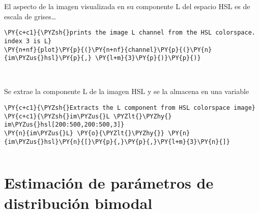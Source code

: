     El aspecto de la imagen visualizada en su componente L del espacio HSL
es de escala de grises\ldots{}

    \begin{tcolorbox}[breakable, size=fbox, boxrule=1pt, pad at break*=1mm,colback=cellbackground, colframe=cellborder]
\begin{Verbatim}[commandchars=\\\{\}]
\PY{c+c1}{\PYZsh{}prints the image L channel from the HSL colorspace. index 3 is L}
\PY{n+nf}{plot}\PY{p}{(}\PY{n+nf}{channel}\PY{p}{(}\PY{n}{im\PYZus{}hsl}\PY{p}{,} \PY{l+m}{3}\PY{p}{)}\PY{p}{)}
\end{Verbatim}
\end{tcolorbox}

    \begin{center}
    \end{center}
    { \hspace*{\fill} \\}
    
    Se extrae la componente L de la imagen HSL y se la almacena en una
variable

    \begin{tcolorbox}[breakable, size=fbox, boxrule=1pt, pad at break*=1mm,colback=cellbackground, colframe=cellborder]
\begin{Verbatim}[commandchars=\\\{\}]
\PY{c+c1}{\PYZsh{}Extracts the L component from HSL colorspace image}
\PY{c+c1}{\PYZsh{}im\PYZus{}L \PYZlt{}\PYZhy{} im\PYZus{}hsl[200:500,200:500,3]}
\PY{n}{im\PYZus{}L} \PY{o}{\PYZlt{}\PYZhy{}} \PY{n}{im\PYZus{}hsl}\PY{n}{[}\PY{p}{,}\PY{p}{,}\PY{l+m}{3}\PY{n}{]}
\end{Verbatim}
\end{tcolorbox}

    \begin{tcolorbox}[breakable, size=fbox, boxrule=1pt, pad at break*=1mm,colback=cellbackground, colframe=cellborder]
\begin{Verbatim}[commandchars=\\\{\}]

\end{Verbatim}
\end{tcolorbox}

    \hypertarget{estimaciuxf3n-de-paruxe1metros-de-distribuciuxf3n-bimodal}{%
\section{Estimación de parámetros de distribución
bimodal}\label{estimaciuxf3n-de-paruxe1metros-de-distribuciuxf3n-bimodal}}

